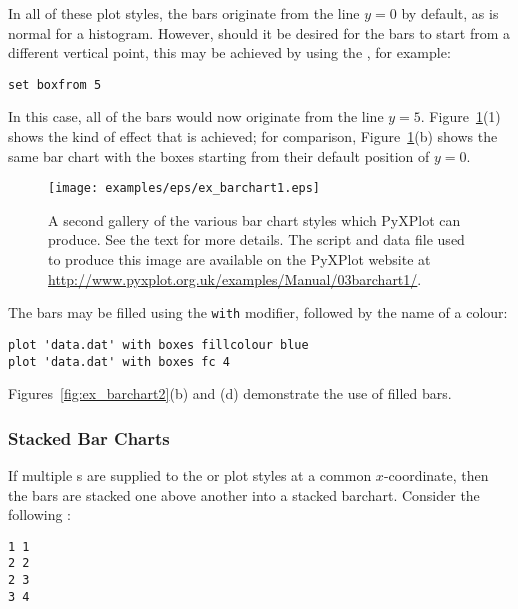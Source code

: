 In all of these plot styles, the bars originate from the line $y=0$ by default,
as is normal for a histogram. However, should it be desired for the bars to
start from a different vertical point, this may be achieved by using the
, for example:

\begin{verbatim}
set boxfrom 5
\end{verbatim}

\noindent In this case, all of the bars would now originate from the line
$y=5$. Figure~\ref{fig:ex_barchart1}(1) shows the kind of effect that is
achieved; for comparison, Figure~\ref{fig:ex_barchart1}(b) shows the same bar
chart with the boxes starting from their default position of $y=0$.

\begin{figure}
\begin{center}
\texttt{[image: examples/eps/ex\_barchart1.eps]}
\end{center}
\caption[A second gallery of the various bar chart styles which PyXPlot can
produce]
{A second gallery of the various bar chart styles which PyXPlot can
produce. See the text for more details.  The script and data file used to
produce this image are available on the PyXPlot website at
\protect\url{http://www.pyxplot.org.uk/examples/Manual/03barchart1/}.}
\label{fig:ex_barchart1}
\end{figure}

The bars may be filled using the {\tt with}  modifier,
followed by the name of a colour:

\begin{verbatim}
plot 'data.dat' with boxes fillcolour blue
plot 'data.dat' with boxes fc 4
\end{verbatim}

\noindent Figures~\ref{fig:ex_barchart2}(b) and (d) demonstrate the use of
filled bars.

\subsubsection{Stacked Bar Charts}

If multiple \datapoint s are supplied to the  or 
plot styles at a common $x$-coordinate, then the bars are stacked one above
another into a stacked barchart. Consider the following \datafile:

\begin{verbatim}
1 1
2 2
2 3
3 4
\end{verbatim}

